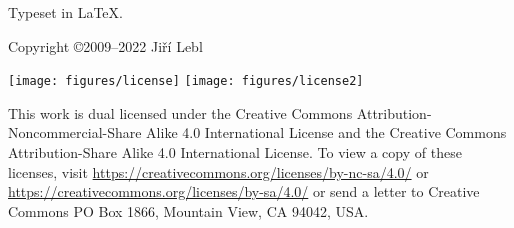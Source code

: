 \documentclass[12pt]{book}
\theoremstyle{plain}
\theoremstyle{remark}
\theoremstyle{definition}
\theoremstyle{exercise}
\theoremstyle{example}
\begin{document}

\ifpdf
\fi
\newlength{\centeroffset}
\setlength{\centeroffset}{-0.5\oddsidemargin}
\addtolength{\centeroffset}{0.5\evensidemargin}
\thispagestyle{empty}
\noindent\hspace*{\centeroffset}

\noindent\hspace*{\centeroffset}



\pagebreak

\vspace*{\fill}

\noindent
Typeset in \LaTeX.


\bigskip

\noindent
Copyright \copyright 2009--2022 Ji{\v r}\'i Lebl

%


\bigskip

\noindent
\texttt{[image: figures/license]}
\quad
\texttt{[image: figures/license2]}

\bigskip

\noindent
This work
is dual licensed under
the Creative Commons
Attribution-Non\-commercial-Share Alike 4.0 International License and
the Creative Commons
Attribution-Share Alike 4.0 International License.
To view a
copy of these licenses, visit
\url{https://creativecommons.org/licenses/by-nc-sa/4.0/}
or
\url{https://creativecommons.org/licenses/by-sa/4.0/}
or send a letter to
Creative Commons
PO Box 1866, Mountain View, CA 94042, USA\@.
\end{document}

